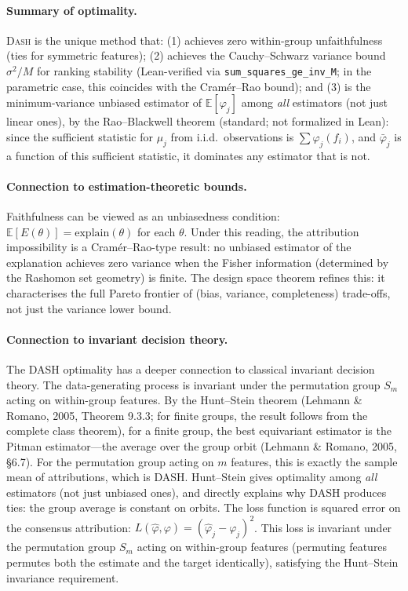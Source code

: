 \documentclass{article}
\newcommand{\E}{\mathbb{E}}
\newcommand{\DASH}{\textsc{Dash}}
\begin{document}
\paragraph{Summary of optimality.}
\DASH{} is the unique method that: (1) achieves zero within-group unfaithfulness (ties for symmetric features); (2) achieves the Cauchy--Schwarz variance bound $\sigma^2/M$ for ranking stability (Lean-verified via \texttt{sum\_squares\_ge\_inv\_M}; in the parametric case, this coincides with the Cram\'er--Rao bound); and (3) is the minimum-variance unbiased estimator of $\E[\varphi_j]$ among \emph{all} estimators (not just linear ones), by the Rao--Blackwell theorem (standard; not formalized in Lean): since the sufficient statistic for $\mu_j$ from i.i.d.\ observations is $\sum \varphi_j(f_i)$, and $\bar\varphi_j$ is a function of this sufficient statistic, it dominates any estimator that is not.

\paragraph{Connection to estimation-theoretic bounds.}
Faithfulness can be viewed as an unbiasedness condition: $\mathbb{E}[E(\theta)] = \text{explain}(\theta)$ for each $\theta$. Under this reading, the attribution impossibility is a Cram\'er--Rao-type result: no unbiased estimator of the explanation achieves zero variance when the Fisher information (determined by the Rashomon set geometry) is finite. The design space theorem refines this: it characterises the full Pareto frontier of (bias, variance, completeness) trade-offs, not just the variance lower bound.

\paragraph{Connection to invariant decision theory.}
The DASH optimality has a deeper connection to classical invariant decision theory. The data-generating process is invariant under the permutation group $S_m$ acting on within-group features. By the Hunt--Stein theorem (Lehmann \& Romano, 2005, Theorem 9.3.3; for finite groups, the result follows from the complete class theorem), for a finite group, the best equivariant estimator is the Pitman estimator---the average over the group orbit (Lehmann \& Romano, 2005, \S 6.7). For the permutation group acting on $m$ features, this is exactly the sample mean of attributions, which is DASH. Hunt--Stein gives optimality among \emph{all} estimators (not just unbiased ones), and directly explains why DASH produces ties: the group average is constant on orbits. The loss function is squared error on the consensus attribution: $L(\hat\varphi, \varphi) = (\hat\varphi_j - \varphi_j)^2$. This loss is invariant under the permutation group $S_m$ acting on within-group features (permuting features permutes both the estimate and the target identically), satisfying the Hunt--Stein invariance requirement.
\end{document}
